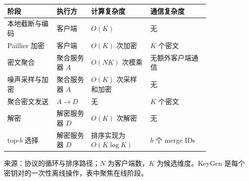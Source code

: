 \setlength{\tabcolsep}{3pt}
\begin{tabular}{p{0.20\linewidth}p{0.14\linewidth}p{0.24\linewidth}p{0.24\linewidth}}
\toprule
阶段 & 执行方 & 计算复杂度 & 通信复杂度 \\
\midrule
本地截断与编码 & 客户端 & $O(K)$ & 无 \\
Paillier 加密 & 客户端 & $O(K)$ 次加密 & $K$ 个密文 \\
密文聚合 & 聚合服务器 $A$ & $O(NK)$ 次模乘 & 无额外客户端通信 \\
噪声采样与加密 & 聚合服务器 $A$ & $O(K)$ 次采样和加密 & 无 \\
聚合密文发送 & $A\rightarrow D$ & 无 & $K$ 个密文 \\
解密 & 解密服务器 $D$ & $O(K)$ 次解密 & 无 \\
top-$b$ 选择 & 解密服务器 $D$ & 排序实现为 $O(K\log K)$ & $b$ 个 merge IDs \\
\bottomrule
\end{tabular}
\par\smallskip\footnotesize 来源：协议的循环与排序路径；$N$ 为客户端数，$K$ 为候选维度。KeyGen 是每个密钥对的一次性离线操作，表中聚焦在线阶段。
